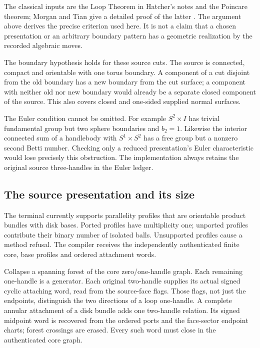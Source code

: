 The classical inputs are the Loop Theorem in Hatcher's notes and the
Poincare theorem; Morgan and Tian give a detailed proof of the latter
\cite{euler-hatcher-three,euler-morgan-tian}.  The argument above derives
the precise criterion used here.  It is not a claim that a chosen
presentation or an arbitrary boundary pattern has a geometric realization
by the recorded algebraic moves.

The boundary hypothesis holds for these source cuts.  The source is
connected, compact and orientable with one torus boundary.  A component
of a cut disjoint from the old boundary has a new boundary from the cut
surface; a component with neither old nor new boundary would already be
a separate closed component of the source.  This also covers closed and
one-sided supplied normal surfaces.

The Euler condition cannot be omitted.  For example $S^2\times I$ has
trivial fundamental group but two sphere boundaries and $b_2=1$.
Likewise the interior connected sum of a handlebody with $S^1\times S^2$
has a free group but a nonzero second Betti number.  Checking only a
reduced presentation's Euler characteristic would lose precisely this
obstruction.  The implementation always retains the original source
three-handles in the Euler ledger.

\subsection{The source presentation and its size}

The terminal currently supports parallelity profiles that are orientable
product bundles with disk bases.  Ported profiles have multiplicity one;
unported profiles contribute their binary number of isolated balls.
Unsupported profiles cause a method refusal.  The compiler receives the
independently authenticated finite core, base profiles and ordered
attachment words.

Collapse a spanning forest of the core zero/one-handle graph.  Each
remaining one-handle is a generator.  Each original two-handle supplies
its actual signed cyclic attaching word, read from the source-face flags.
Those flags, not just the endpoints, distinguish the two directions of a
loop one-handle.  A complete annular attachment of a disk bundle adds
one two-handle relation.  Its signed midpoint word is recovered from the
ordered ports and the face-sector endpoint charts; forest crossings are
erased.  Every such word must close in the authenticated core graph.

